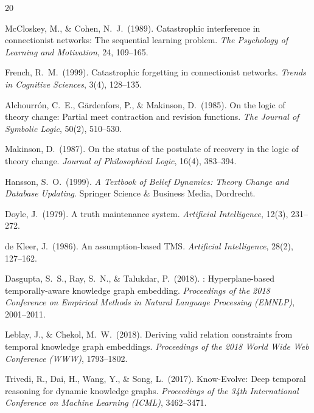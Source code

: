 \documentclass[11pt,a4paper]{article}
\theoremstyle{definition}
\begin{document}
\begin{thebibliography}{20}

McCloskey, M., \& Cohen, N.~J.\ (1989).
\newblock Catastrophic interference in connectionist networks: The sequential learning problem.
\newblock \textit{The Psychology of Learning and Motivation}, 24, 109--165.

French, R.~M.\ (1999).
\newblock Catastrophic forgetting in connectionist networks.
\newblock \textit{Trends in Cognitive Sciences}, 3(4), 128--135.

Alchourr{\'o}n, C.~E., G{\"a}rdenfors, P., \& Makinson, D.\ (1985).
\newblock On the logic of theory change: Partial meet contraction and revision functions.
\newblock \textit{The Journal of Symbolic Logic}, 50(2), 510--530.

Makinson, D.\ (1987).
\newblock On the status of the postulate of recovery in the logic of theory change.
\newblock \textit{Journal of Philosophical Logic}, 16(4), 383--394.

Hansson, S.~O.\ (1999).
\newblock \textit{A Textbook of Belief Dynamics: Theory Change and Database Updating}.
\newblock Springer Science \& Business Media, Dordrecht.

Doyle, J.\ (1979).
\newblock A truth maintenance system.
\newblock \textit{Artificial Intelligence}, 12(3), 231--272.

de Kleer, J.\ (1986).
\newblock An assumption-based {TMS}.
\newblock \textit{Artificial Intelligence}, 28(2), 127--162.

Dasgupta, S.~S., Ray, S.~N., \& Talukdar, P.\ (2018).
: Hyperplane-based temporally-aware knowledge graph embedding.
\newblock \textit{Proceedings of the 2018 Conference on Empirical Methods in Natural Language Processing (EMNLP)}, 2001--2011.

Leblay, J., \& Chekol, M.~W.\ (2018).
\newblock Deriving valid relation constraints from temporal knowledge graph embeddings.
\newblock \textit{Proceedings of the 2018 World Wide Web Conference (WWW)}, 1793--1802.

Trivedi, R., Dai, H., Wang, Y., \& Song, L.\ (2017).
\newblock Know-Evolve: Deep temporal reasoning for dynamic knowledge graphs.
\newblock \textit{Proceedings of the 34th International Conference on Machine Learning (ICML)}, 3462--3471.


\end{thebibliography}
\end{document}
